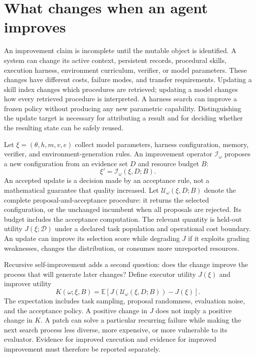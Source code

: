 \section{What changes when an agent improves}\label{sec:C30:01}
An improvement claim is incomplete until the mutable object is identified. A system can change its active context, persistent records, procedural skills, execution harness, environment curriculum, verifier, or model parameters. These changes have different costs, failure modes, and transfer requirements. Updating a skill index changes which procedures are retrieved; updating a model changes how every retrieved procedure is interpreted. A harness search can improve a frozen policy without producing any new parametric capability. Distinguishing the update target is necessary for attributing a result and for deciding whether the resulting state can be safely reused.

Let $\xi=(\theta,h,m,v,e)$ collect model parameters, harness configuration, memory, verifier, and environment-generation rules. An improvement operator $\mathcal I_\omega$ proposes a new configuration from an evidence set $D$ and resource budget $B$:
\begin{equation}
 \xi'=\mathcal I_\omega(\xi,D;B).
\end{equation}
An accepted update is a decision made by an acceptance rule, not a mathematical guarantee that quality increased. Let $\mathcal U_\omega(\xi,D;B)$ denote the complete proposal-and-acceptance procedure: it returns the selected configuration, or the unchanged incumbent when all proposals are rejected. Its budget includes the acceptance computation. The relevant quantity is held-out utility $J(\xi;\mathcal D)$ under a declared task population and operational cost boundary. An update can improve its selection score while degrading $J$ if it exploits grading weaknesses, changes the distribution, or consumes more unreported resources.

Recursive self-improvement adds a second question: does the change improve the process that will generate later changes? Define executor utility $J(\xi)$ and improver utility
\begin{equation}
 K(\omega;\xi,B)=
 \mathbb E\left[J(\mathcal U_\omega(\xi,D;B))-J(\xi)\right].
 \label{eq:c30:improver}
\end{equation}
The expectation includes task sampling, proposal randomness, evaluation noise, and the acceptance policy. A positive change in $J$ does not imply a positive change in $K$. A patch can solve a particular recurring failure while making the next search process less diverse, more expensive, or more vulnerable to its evaluator. Evidence for improved execution and evidence for improved improvement must therefore be reported separately.


